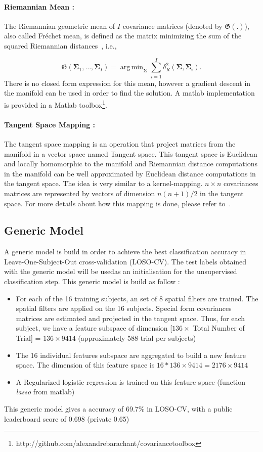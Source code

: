\documentclass[11pt,a4paper]{article}
\newcommand{\argmin}{\mathop{\mathrm{arg\,min}}}
\begin{document}
\paragraph{Riemannian Mean :}
The Riemannian geometric mean of $I$ covariance matrices (denoted by $\mathfrak{G}(.)$), also called Fr\'echet mean, is defined as the matrix minimizing the sum of the squared Riemannian distances~\cite{pennec2006riemannian}, i.e.,

\begin{equation}
\mathfrak{G} \left( \mathbf{\Sigma}_1,\ldots,\mathbf{\Sigma}_I \right) = \argmin_{\mathbf{\Sigma}} 
\sum_{i=1}^{I} 
\delta_R^2 \left( \mathbf{\Sigma},\mathbf{\Sigma}_i \right).
\label{eq:geo_mean}
\end{equation}
There is no closed form expression for this mean, however a gradient descent in the manifold can be used in order to find the solution. A matlab implementation is provided in a Matlab toolbox\footnote{http://github.com/alexandrebarachant/covariancetoolbox}.

\paragraph{Tangent Space Mapping :} The tangent space mapping is an operation that project matrices from the manifold in a vector space named Tangent space. This tangent space is Euclidean and locally homomorphic to the manifold and Riemannian distance computations in the manifold can be well approximated by Euclidean distance computations in the tangent space. The idea is very similar to a kernel-mapping. 
$n\times n$ covariances matrices are represented by vectors of dimension $n(n+1)/2$ in the tangent space. For more details about how this mapping is done, please refer to~\cite{NEUROCOMP}.

\subsection{Generic Model}
A generic model is build in order to achieve the best classification accuracy in Leave-One-Subject-Out cross-validation (LOSO-CV). The test labels obtained with the generic model will be usedas an initialisation for the unsupervised classification step. This generic model is build as follow : 
\begin{itemize}
\item For each of the 16 training subjects, an set of 8 spatial filters are trained. The spatial filters are applied on the 16 subjects. Special form covariances matrices are estimated and projected in the tangent space. Thus, for each subject, we have a feature subspace of dimension [$ 136 \times $ Total Number of Trial] = $136 \times 9414$ (approximately 588 trial per subjects)
\item The 16 individual features subspace are aggregated to build a new feature space. The dimension of this feature space is $16*136 \times 9414 = 2176 \times 9414$
\item A Regularized logistic regression is trained on this feature space (function \emph{lasso }from matlab)
\end{itemize}
This generic model gives a accuracy of 69.7\% in LOSO-CV, with a public leaderboard score of 0.698 (private 0.65)
\end{document}

